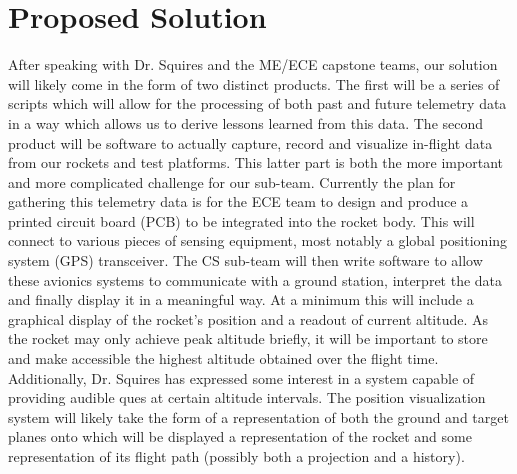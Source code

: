 \documentclass[onecolumn, draftclsnofoot,10pt, compsoc]{IEEEtran}
\begin{document}
\section{Proposed Solution}
After speaking with Dr. Squires and the ME/ECE capstone teams, our solution will likely come in the form of two distinct products. 
The first will be a series of scripts which will allow for the processing of both past and future telemetry data in a way which allows us to derive lessons learned from this data. 
The second product will be software to actually capture, record and visualize in-flight data from our rockets and test platforms. 
This latter part is both the more important and more complicated challenge for our sub-team.
Currently the plan for gathering this telemetry data is for the ECE team to design and produce a printed circuit board (PCB) to be integrated into the rocket body. 
This will connect to various pieces of sensing equipment, most notably a global positioning system (GPS) transceiver. 
The CS sub-team will then write software to allow these avionics systems to communicate with a ground station, interpret the data and finally display it in a meaningful way. 
At a minimum this will include a graphical display of the rocket's position and a readout of current altitude. 
As the rocket may only achieve peak altitude briefly, it will be important to store and make accessible the highest altitude obtained over the flight time. 
Additionally, Dr. Squires has expressed some interest in a system capable of providing audible ques at certain altitude intervals. 
The position visualization system will likely take the form of a representation of both the ground and target planes onto which will be displayed a representation of the rocket and some representation of its flight path (possibly both a projection and a history).
\end{document}
